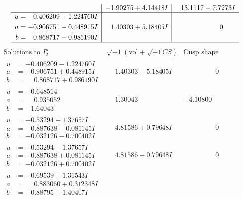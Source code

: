 \documentclass[1p]{elsarticle_modified}
\theoremstyle{definition}
\newcommand{\I}{\sqrt{-1}}
\begin{document}
$$\begin{array}{c|c|c}
 & -1.90275 + 4.14418 I & \phantom{-}13.1117 - 7.7273 I \\ \hline\begin{aligned}
u &= -0.406209 + 1.224760 I \\
a &= -0.906751 - 0.448915 I \\
b &= \phantom{-}0.868717 - 0.986190 I\end{aligned}
 & \phantom{-}1.40303 + 5.18405 I & \phantom{-0.000000 } 0\\
 \hline 
 \end{array}$$\newpage$$\begin{array}{c|c|c}  
\text{Solutions to }I^u_{2}& \I (\text{vol} + \sqrt{-1}CS) & \text{Cusp shape}\\
 \hline 
\begin{aligned}
u &= -0.406209 - 1.224760 I \\
a &= -0.906751 + 0.448915 I \\
b &= \phantom{-}0.868717 + 0.986190 I\end{aligned}
 & \phantom{-}1.40303 - 5.18405 I & \phantom{-0.000000 } 0 \\ \hline\begin{aligned}
u &= -0.648514\phantom{ +0.000000I} \\
a &= \phantom{-}0.935052\phantom{ +0.000000I} \\
b &= -1.64043\phantom{ +0.000000I}\end{aligned}
 & \phantom{-}1.30043\phantom{ +0.000000I} & -4.10800\phantom{ +0.000000I} \\ \hline\begin{aligned}
u &= -0.53294 + 1.37657 I \\
a &= -0.887638 - 0.081145 I \\
b &= -0.032126 - 0.700402 I\end{aligned}
 & \phantom{-}4.81586 + 0.79648 I & \phantom{-0.000000 } 0 \\ \hline\begin{aligned}
u &= -0.53294 - 1.37657 I \\
a &= -0.887638 + 0.081145 I \\
b &= -0.032126 + 0.700402 I\end{aligned}
 & \phantom{-}4.81586 - 0.79648 I & \phantom{-0.000000 } 0 \\ \hline\begin{aligned}
u &= -0.69539 + 1.31543 I \\
a &= \phantom{-}0.883060 + 0.312348 I \\
b &= -0.88795 + 1.40407 I\end{aligned}

\end{array}$$
\end{document}
